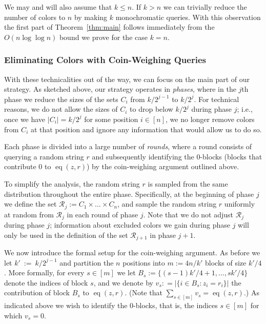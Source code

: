 \documentclass[english,a4paper,11pt]{article}
\newcommand{\cR}{{\mathcal{R}}}
\DeclareMathOperator{\eq}{eq}
\begin{document}
{We may and will also assume that $k\leq n$. If $k>n$ we can trivially reduce the number of colors to $n$ by making $k$ monochromatic queries. With this observation the first part of Theorem~\ref{thm:main} follows immediately from the $O(n\log\log n)$ bound we  prove for the case $k=n$. 

\subsubsection{Eliminating Colors with Coin-Weighing Queries}

With these technicalities out of the way, we can focus on the main part of our strategy. 
As sketched above, our strategy operates in \emph{phases}, where in the $j$th phase we reduce the sizes of the sets $C_i$ from $k/2^{j-1}$ to  $k/2^j$. 
For technical reasons, we do not allow the sizes of $C_i$ to drop below $k/2^j$ during phase $j$; i.e., once we have $|C_i|=k/2^j$ for some position $i\in[n]$, we no longer remove colors from $C_i$ at that position and ignore any information that would allow us to do so.

Each phase is divided into a large number of \emph{rounds}, where a round consists of querying a random string $r$ and subsequently identifying the $0$-blocks (blocks that contribute $0$ to $\eq(z,r)$) by the coin-weighing argument outlined above.

To simplify the analysis, the random string $r$ is sampled from the same distribution throughout the entire phase. Specifically, at the beginning of phase $j$ we define the set $\cR_j:=C_1\times \dots \times C_n$, and sample the random string $r$ uniformly at random from $\cR_j$ in each round of phase $j$. Note that we do not adjust $\cR_j$ during phase $j$; information about excluded colors we gain during phase $j$ will only be used in the definition of the set $\cR_{j+1}$ in phase $j+1$. %

We now introduce the formal setup for the coin-weighing argument. As before we let $k'~:=~k/2^{j-1}$ and partition the $n$ positions into $m := 4 n / k'$ blocks of size $k'/4$. 
More formally, for every $s \in [m]$ we let $B_s := \{ (s-1) k'/4 +1, \dots, s k'/4 \}$ denote the indices of block $s$, and we denote by $v_s: = | \{ i \in B_s : z_i = r_i \} |$ the contribution of block $B_s$ to $\eq(z,r)$. (Note that $\sum_{s \in [m]} v_s = \eq(z,r)$.) As indicated above we wish to identify the 0-blocks, that is, the indices $s \in [m]$ for which $v_s = 0$. 


}
\end{document}
